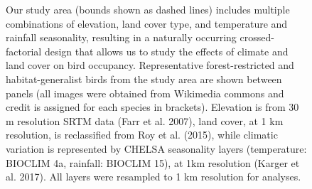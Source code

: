 \begin{figure}[t!]
{        Our study area (bounds shown as dashed lines) includes multiple combinations of elevation, land cover type, and temperature and rainfall seasonality, resulting in a naturally occurring crossed-factorial design that allows us to study the effects of climate and land cover on bird occupancy. 
        Representative forest-restricted and habitat-generalist birds from the study area are shown between panels (all images were obtained from Wikimedia commons and credit is assigned for each species in brackets).
        Elevation is from 30 m resolution SRTM data (Farr et al. 2007), land cover, at 1 km resolution, is reclassified from Roy et al. (2015), while climatic variation is represented by CHELSA seasonality layers (temperature: BIOCLIM 4a, rainfall: BIOCLIM 15), at 1km resolution (Karger et al. 2017). All layers were resampled to 1 km resolution for analyses.
    }
    \label{hilly_fig_01}
\end{figure}

